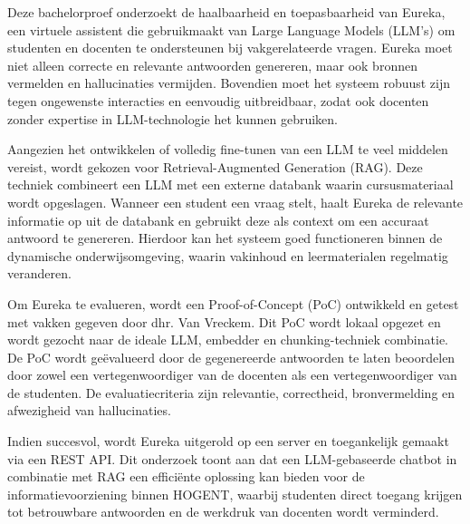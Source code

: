Deze bachelorproef onderzoekt de haalbaarheid en toepasbaarheid van Eureka, een virtuele assistent die gebruikmaakt van Large Language Models (LLM’s) om studenten en docenten te ondersteunen bij vakgerelateerde vragen. Eureka moet niet alleen correcte en relevante antwoorden genereren, maar ook bronnen vermelden en hallucinaties vermijden. Bovendien moet het systeem robuust zijn tegen ongewenste interacties en eenvoudig uitbreidbaar, zodat ook docenten zonder expertise in LLM-technologie het kunnen gebruiken.

Aangezien het ontwikkelen of volledig fine-tunen van een LLM te veel middelen vereist, wordt gekozen voor Retrieval-Augmented Generation (RAG). Deze techniek combineert een LLM met een externe databank waarin cursusmateriaal wordt opgeslagen. Wanneer een student een vraag stelt, haalt Eureka de relevante informatie op uit de databank en gebruikt deze als context om een accuraat antwoord te genereren. Hierdoor kan het systeem goed functioneren binnen de dynamische onderwijsomgeving, waarin vakinhoud en leermaterialen regelmatig veranderen.

Om Eureka te evalueren, wordt een Proof-of-Concept (PoC) ontwikkeld en getest met vakken gegeven door dhr. Van Vreckem. Dit PoC wordt lokaal opgezet en wordt gezocht naar de ideale LLM, embedder en chunking-techniek combinatie. De PoC wordt geëvalueerd door de gegenereerde antwoorden te laten beoordelen door zowel een vertegenwoordiger van de docenten als een vertegenwoordiger van de studenten. De evaluatiecriteria zijn relevantie, correctheid, bronvermelding en afwezigheid van hallucinaties.

Indien succesvol, wordt Eureka uitgerold op een server en toegankelijk gemaakt via een REST API. Dit onderzoek toont aan dat een LLM-gebaseerde chatbot in combinatie met RAG een efficiënte oplossing kan bieden voor de informatievoorziening binnen HOGENT, waarbij studenten direct toegang krijgen tot betrouwbare antwoorden en de werkdruk van docenten wordt verminderd.
